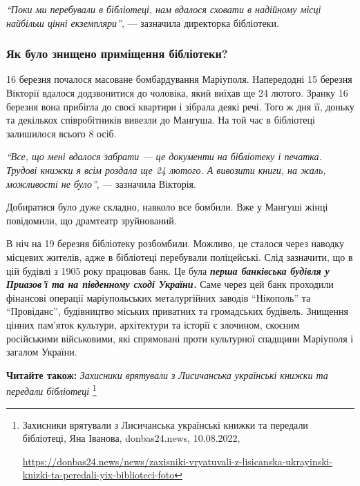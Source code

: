 \begin{leftbar}
\emph{\enquote{Поки ми перебували в бібліотеці, нам вдалося сховати в надійному місці
найбільш цінні екземпляри}}, — зазначила директорка бібліотеки.
\end{leftbar}

\subsubsection{Як було знищено приміщення бібліотеки?}


16 березня почалося масоване бомбардування Маріуполя. Напередодні 15 березня
Вікторії вдалося додзвонитися до чоловіка, який виїхав ще 24 лютого. Зранку 16
березня вона прибігла до своєї квартири і зібрала деякі речі. Того ж дня її,
доньку та декількох співробітників вивезли до Мангуша. На той час в бібліотеці
залишилося всього 8 осіб.

\begin{leftbar}
\emph{\enquote{Все, що мені вдалося забрати — це документи на бібліотеку і печатка. Трудові
книжки я всім роздала ще 24 лютого. А вивозити книги, на жаль,
можливості не було}}, — зазначила Вікторія.
\end{leftbar}

Добиратися було дуже складно, навколо все бомбили. Вже у Мангуші жінці
повідомили, що драмтеатр зруйнований.


В ніч на 19 березня бібліотеку розбомбили. Можливо, це сталося через наводку
місцевих жителів, адже в бібліотеці перебували поліцейські. Слід зазначити, що
в цій будівлі з 1905 року працював банк. Це була \emph{\textbf{перша банківська будівля у
Приазов'ї та на південному сході України.}} Саме через цей банк проходили
фінансові операції маріупольських металургійних заводів \enquote{Нікополь} та
\enquote{Провіданс}, будівництво міських приватних та громадських будівель. Знищення
цінних пам'яток культури, архітектури та історії є злочином, скоєним
російськими військовими, які спрямовані проти культурної спадщини Маріуполя і
загалом України.

\textbf{Читайте також:} \emph{Захисники врятували з Лисичанська українські книжки та передали бібліотеці}%
\footnote{Захисники врятували з Лисичанська українські книжки та передали бібліотеці, Яна Іванова, donbas24.news, 10.08.2022, \par%
\url{https://donbas24.news/news/zaxisniki-vryatuvali-z-lisicanska-ukrayinski-knizki-ta-peredali-yix-biblioteci-foto}%
}

